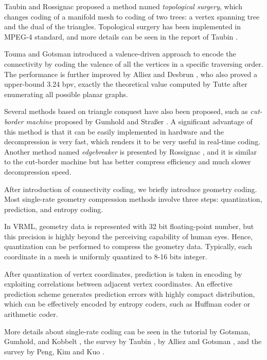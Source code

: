 \documentclass[11pt, a4paper]{report}
\begin{document}
    Taubin and Rossignac \cite{274365} proposed a method named
    \emph{topological surgery}, which changes coding of a manifold
    mesh to coding of two trees: a vertex spanning tree and the dual of the triangles.
    Topological surgery has been implemented in MPEG-4 standard, and more details
    can be seen in the report of Taubin \cite{3d:Taubin}.
    
    Touma and Gotsman \cite{triangle:Touma} introduced a
    valence-driven approach to encode the connectivity by coding the
    valence of all the vertices in a specific traversing order. 
    The performance is further improved
    by Alliez and Desbrun \cite{alliez01valencedriven}, who also proved a
    upper-bound 3.24 bpv, exactly the theoretical value computed
    by Tutte \cite{census:Tutte} after enumerating all possible planar
    graphs.

    Several methods based on triangle conquest have also been
    proposed, such as \emph{cut-border machine} proposed by 
    Gumhold and Stra\ss{}er \cite{280836}.
    A significant advantage of this method is that it can be easily implemented
    in hardware and the decompression is very fast, which
    renders it to be very useful in real-time coding. 
    Another method named \emph{edgebreaker} is presented by Rossignac \cite{614421},
    and it is similar to the cut-border machine but has better
    compress efficiency and much slower decompression speed.
    
    After introduction of connectivity coding, we briefly introduce geometry
    coding. Most single-rate geometry compression methods involve three steps:
    quantization, prediction, and entropy coding.

    In VRML, geometry data is represented with 32 bit floating-point
    number, but this precision is highly beyond the perceiving
    capability of human eyes. Hence, quantization can be performed to
    compress the geometry data. Typically, each coordinate in a mesh is
    uniformly quantized to 8-16 bits integer.

    After quantization of vertex coordinates, prediction is taken in
    encoding by exploiting correlations between adjacent vertex
    coordinates. An effective prediction scheme generates prediction
    errors with highly compact distribution, which can be effectively
    encoded by entropy coders, such as Huffman coder or arithmetic
    coder. 

    More details about single-rate coding can be seen in the tutorial
    by Gotsman, Gumhold, and Kobbelt \cite{gotsman-simplification},
    the survey by Taubin \cite{3d:Taubin}, by Alliez and Gotsman
    \cite{recent:alliez}, and the survey by Peng, Kim and Kuo
    \cite{technologies:peng}.
    
\end{document}
